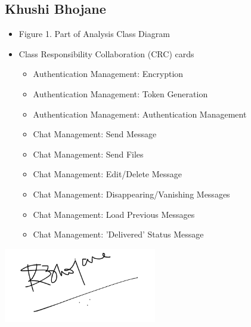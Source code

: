 \documentclass[]{article}
\begin{document}
\subsection{Khushi Bhojane}
\label{subsec:khushi_bhojane}
\begin{itemize}
	\item Figure 1. Part of Analysis Class Diagram
	\item Class Responsibility Collaboration (CRC) cards
 		\begin{itemize}
   			\item Authentication Management: Encryption
      			\item Authentication Management: Token Generation
	 		\item Authentication Management: Authentication Management
    			\item Chat Management: Send Message
       			\item Chat Management: Send Files
	  		\item Chat Management: Edit/Delete Message
     			\item Chat Management: Disappearing/Vanishing Messages
			\item Chat Management: Load Previous Messages
   			\item Chat Management: 'Delivered' Status Message
      		\end{itemize}
\end{itemize}
\includegraphics[width=0.5\textwidth]{khushi_signature.png}
\end{document}
